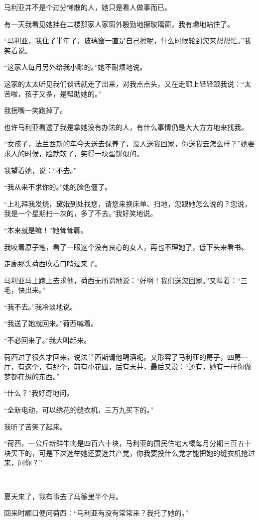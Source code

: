 \par 马利亚并不是个过分懒散的人，她只是看人做事而已。
\par 有一天我看见她挂在二楼那家人家窗外殷勤地擦玻璃窗，我有趣地站住了。
\par “马利亚，我住了半年了，玻璃窗一直是自己擦呢，什么时候轮到您来帮帮忙。”我笑着说。
\par “这家人每月另外给我小账的。”她不耐烦地说。
\par 这家的太太听见我们谈话就走了出来，对我点点头，又在走廊上轻轻跟我说：“太苦啦，孩子又多，是帮助她的。”
\par 我抿嘴一笑跑掉了。
\par 也许马利亚看透了我是拿她没有办法的人，有什么事情仍是大大方方地来找我。
\par “女孩子，法兰西斯的车今天送去保养了，没人送我回家，你送我去怎么样？”她要求人的时候，脸就软了，笑得一块蛋饼似的。
\par 我望着她，说：“不去。”
\par “我从来不求你的。”她的脸色僵了。
\par “上礼拜我发烧，黛娥到处找您，请您来换床单、扫地，您跟她怎么说的？您说，我是一个星期扫一次的，多了不去。”我好笑地说。
\par “本来就是嘛！”她耸耸肩。
\par 我咬着原子笔，看了一眼这个没有良心的女人，再也不理她了，低下头来看书。
\par 走廊那头荷西吹着口哨过来了。
\par 马利亚马上跑上去求他，荷西无所谓地说：“好啊！我们送您回家。”又叫着：“三毛，快出来。”
\par “我不去。”我冷淡地说。
\par “我送了她就回来。”荷西喊着。
\par “不必回来了。”我大叫起来。
\par 荷西过了很久才回来，说法兰西斯请他喝酒呢。又形容了马利亚的房子，四房一厅，有这个，有那个，前有小花圃，后有天井，最后又说：“还有，她有一样你做梦都在想的东西。”
\par “什么？”我好奇地问。
\par “全新电动，可以绣花的缝衣机，三万九买下的。”
\par 我听了苦笑了起来。
\par “荷西，一公斤新鲜牛肉是四百六十块，马利亚的国民住宅大概每月分期三百五十块买下的，可是下次选举她还要选共产党，你我要投什么党才能把她的缝衣机抢过来，问你？”
\par  
\par 夏天来了，我有事去了马德里半个月。
\par 回来时顺口便问荷西：“马利亚有没有常常来？我托了她的。”
